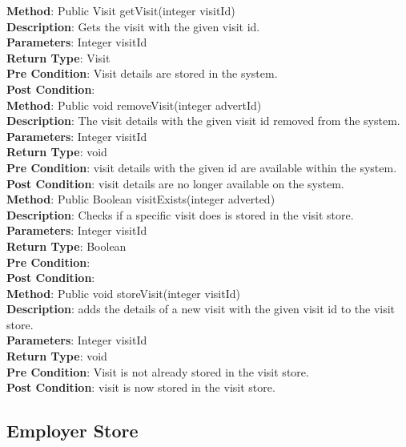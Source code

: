 \documentclass{l3deliverable}
\begin{document}
\textbf{Method}: Public Visit getVisit(integer visitId)\\
\textbf{Description}: Gets the visit with the given visit id. \\
\textbf{Parameters}: Integer visitId\\
\textbf{Return Type}: Visit\\
\textbf{Pre Condition}: Visit details are stored in the system.\\
\textbf{Post Condition}:\\

\textbf{Method}: Public void removeVisit(integer advertId)\\
\textbf{Description}: The visit details with the given visit id removed from the system. \\
\textbf{Parameters}: Integer visitId\\
\textbf{Return Type}: void\\
\textbf{Pre Condition}: visit details with the given id are available within the system.\\
\textbf{Post Condition}: visit details are no longer available on the system.\\

\textbf{Method}: Public Boolean visitExists(integer adverted)\\
\textbf{Description}: Checks if a specific visit does is stored in the visit store. \\
\textbf{Parameters}: Integer visitId\\
\textbf{Return Type}: Boolean\\
\textbf{Pre Condition}:\\
\textbf{Post Condition}:\\

\textbf{Method}: Public void storeVisit(integer visitId) \\
\textbf{Description}:  adds the details of a new visit with the given visit id to the visit store.\\
\textbf{Parameters}: Integer visitId\\
\textbf{Return Type}: void\\
\textbf{Pre Condition}: Visit is not already stored in the visit store.\\
\textbf{Post Condition}: visit is now stored in the visit store.\\

\subsection{Employer Store}
\end{document}
